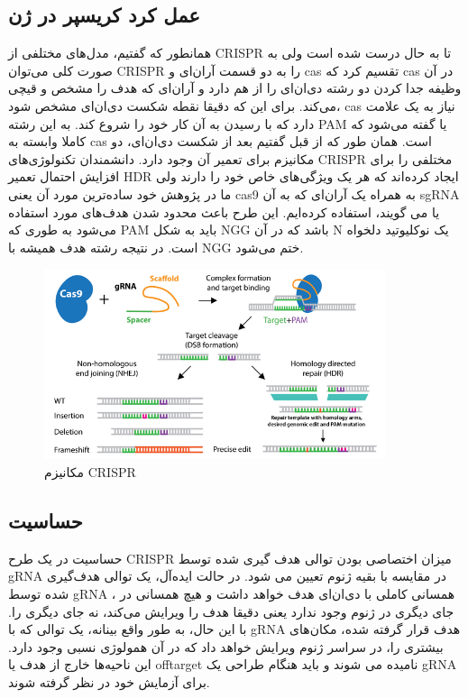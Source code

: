 \documentclass[12pt,a4paper,BCOR=.7cm,headsepline,bibliography=totoc]{report}
\begin{document}
\subsection{عمل کرد کریسپر در ژن}
همانطور که گفتیم، مدل‌های مختلفی از CRISPR تا به حال درست شده است ولی به صورت کلی می‌توان CRISPR را به دو قسمت آر‌ان‌ای و  cas تقسیم کرد که cas در آن وظیفه جدا کردن دو رشته دی‌ان‌ای را از هم دارد و آر‌ان‌ای که هدف را مشخص و قیچی می‌کند. برای این که دقیقا نقطه شکست دی‌ان‌ای مشخص شود، cas نیاز به یک علامت دارد که با رسیدن به آن کار خود را شروع کند. به این رشته PAM یا 
گفته می‌شود که کاملا وابسته به cas است. همان طور که از قبل گفتیم بعد از شکست دی‌ان‌ای، دو مکانیزم برای تعمیر آن وجود دارد. دانشمندان تکنولوژی‌های CRISPR مختلفی را برای افزایش احتمال تعمیر HDR ایجاد کرده‌اند که هر یک ویژگی‌های خاص خود را دارند ولی ما در پژوهش خود ساده‌ترین مورد آن یعنی cas9 به همراه یک آر‌ان‌ای که به آن sgRNA یا 
می گویند، استفاده کرده‌ایم. این طرح باعث محدود شدن هدف‌های مورد استفاده می‌شود به طوری که ‌PAM باید به شکل NGG باشد که در آن N یک نوکلیوتید دلخواه است. در نتیجه رشته هدف همیشه با NGG ختم می‌شود. 
\begin{figure}[!h]
\centering
\includegraphics[width=10cm, ]{pictures/cut.png}
\caption{
مکانیزم CRISPR \cite{addgene}
}\label{fig:2}
\end{figure}
 
\subsection{حساسیت}
حساسیت در یک طرح CRISPR میزان اختصاصی بودن توالی هدف گیری شده توسط gRNA در مقایسه با بقیه ژنوم تعیین می شود. در حالت ایده‌آل، یک توالی هدف‌گیری شده توسط gRNA ، همسانی کاملی با دی‌ان‌ای هدف خواهد داشت و هیچ همسانی در جای دیگری در ژنوم وجود ندارد یعنی دقیقا هدف را ویرایش می‌کند، نه جای دیگری را. با این حال، به طور واقع بینانه، یک توالی که با gRNA هدف قرار گرفته شده، مکان‌های بیشتری را، در سراسر ژنوم ویرایش خواهد داد که در آن همولوژی نسبی وجود دارد. این ناحیه‌ها خارج از هدف یا offtarget نامیده می شوند و باید هنگام طراحی یک gRNA برای آزمایش خود در نظر گرفته شوند.
\end{document}
